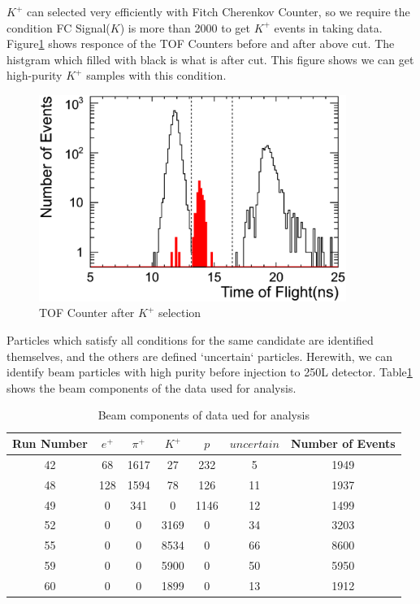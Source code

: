 $K^{+}$ can selected very efficiently with Fitch Cherenkov Counter,
so we require the condition FC Signal($K$) is more than 2000
to get $K^{+}$ events in taking data.
Figure\ref{fig:TOF_cut} shows responce of the TOF Counters before and after above cut.
The histgram which filled with black is what is after cut.
This figure shows we can get high-purity $K^{+}$ samples with this condition.

\begin{figure}[htbp]
  \centering
  \includegraphics[width=10cm,clip]{fig/TOF_cut.eps}
  \caption{TOF Counter after $K^{+}$ selection}
  \label{fig:TOF_cut}
\end{figure}

Particles which satisfy all conditions for the same candidate are identified themselves, and the others are defined `uncertain` particles.
Herewith, we can identify beam particles with high purity before injection to 250L detector.
Table\ref{tb:component} shows the beam components of the data used for analysis.\\

\begin{table}
  \centering
  \begin{tabular}[htb]{ccccccc}\hline
    Run Number    & $e^{+}$ & $\pi^{+}$ & $K^{+}$ & $p$   & $uncertain$ & Number of Events \\ \hline
    42            & 68      & 1617      & 27      & 232   & 5           & 1949             \\
    48            & 128     & 1594      & 78      & 126   & 11          & 1937             \\
    49            & 0       & 341       & 0       & 1146  & 12          & 1499             \\
    52            & 0       & 0         & 3169    & 0     & 34          & 3203             \\
    55            & 0       & 0         & 8534    & 0     & 66          & 8600             \\
    59            & 0       & 0         & 5900    & 0     & 50          & 5950             \\
    60            & 0       & 0         & 1899    & 0     & 13          & 1912             \\ \hline
  \end{tabular}
  \label{tb:component}
  \caption{Beam components of data ued for analysis}
\end{table}

